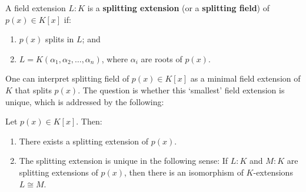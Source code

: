\begin{definition}
A field extension $L:K$ is a \textbf{splitting extension} (or a \textbf{splitting field}) of $p(x) \in K[x]$ if:
\begin{enumerate}
    \item[(a)] $p(x)$ splits in $L$; and
    \item[(b)] $L = K(\alpha_1, \alpha_2, \ldots, \alpha_n)$, where $\alpha_i$ are roots of $p(x)$.
\end{enumerate}
\end{definition}


One can interpret splitting field of $p(x) \in K[x]$ as a minimal field extension of $K$ that splits $p(x)$. The question is whether this `smallest' field extension is unique, which is addressed by the following:
\begin{theorem}
Let $p(x) \in K[x]$. Then:
\begin{enumerate}
    \item[(a)] There exists a splitting extension of $p(x)$.
    \item[(b)] The splitting extension is unique in the following sense: If $L:K$ and $M:K$ are splitting extensions of $p(x)$, then there is an isomorphism of $K$-extensions $L \cong M$.
\end{enumerate}
\end{theorem}

